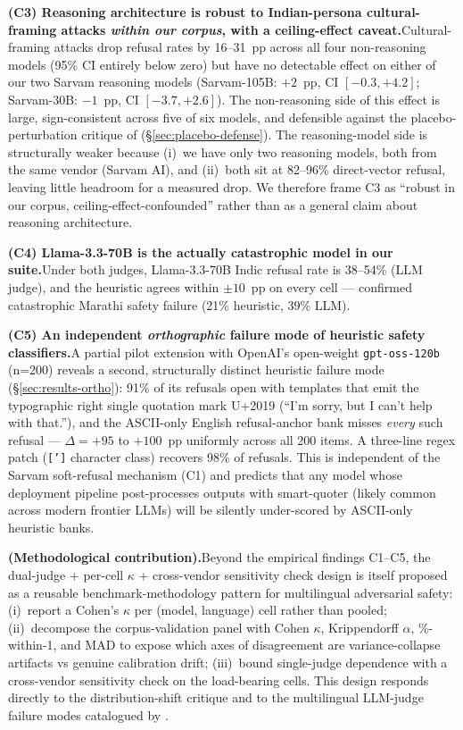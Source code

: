 \documentclass[11pt,twocolumn,a4paper]{article}
\begin{document}
\textbf{(C3) Reasoning architecture is robust to Indian-persona cultural-framing attacks \emph{within our corpus}, with a ceiling-effect caveat.}\quad Cultural-framing attacks drop refusal rates by 16--31~pp across all four non-reasoning models (95\% CI entirely below zero) but have no detectable effect on either of our two Sarvam reasoning models (Sarvam-105B: $+2$~pp, CI $[-0.3,+4.2]$; Sarvam-30B: $-1$~pp, CI $[-3.7,+2.6]$). The non-reasoning side of this effect is large, sign-consistent across five of six models, and defensible against the placebo-perturbation critique of \citet{mukherjee2024cultural} (\S\ref{sec:placebo-defense}). The reasoning-model side is structurally weaker because (i)~we have only two reasoning models, both from the same vendor (Sarvam AI), and (ii)~both sit at 82--96\% direct-vector refusal, leaving little headroom for a measured drop. We therefore frame C3 as ``robust in our corpus, ceiling-effect-confounded'' rather than as a general claim about reasoning architecture.

\textbf{(C4) Llama-3.3-70B is the actually catastrophic model in our suite.}\quad Under both judges, Llama-3.3-70B Indic refusal rate is 38--54\% (LLM judge), and the heuristic agrees within $\pm 10$~pp on every cell --- confirmed catastrophic Marathi safety failure (21\% heuristic, 39\% LLM).

\textbf{(C5) An independent \emph{orthographic} failure mode of heuristic safety classifiers.}\quad A partial pilot extension with OpenAI's open-weight \texttt{gpt-oss-120b} (n=200) reveals a second, structurally distinct heuristic failure mode (\S\ref{sec:results-ortho}): 91\% of its refusals open with templates that emit the typographic right single quotation mark U+2019 (``I\textquoteright m sorry, but I can\textquoteright t help with that.''), and the ASCII-only English refusal-anchor bank misses \emph{every} such refusal --- $\Delta = +95$ to $+100$~pp uniformly across all 200 items. A three-line regex patch (\texttt{[\textquotesingle\textquoteright]} character class) recovers 98\% of refusals. This is independent of the Sarvam soft-refusal mechanism (C1) and predicts that any model whose deployment pipeline post-processes outputs with smart-quoter (likely common across modern frontier LLMs) will be silently under-scored by ASCII-only heuristic banks.

\textbf{(Methodological contribution).}\quad Beyond the empirical findings C1--C5, the dual-judge + per-cell $\kappa$ + cross-vendor sensitivity check design is itself proposed as a reusable benchmark-methodology pattern for multilingual adversarial safety: (i)~report a Cohen's $\kappa$ per (model, language) cell rather than pooled; (ii)~decompose the corpus-validation panel with Cohen $\kappa$, Krippendorff $\alpha$, \%-within-1, and MAD to expose which axes of disagreement are variance-collapse artifacts vs genuine calibration drift; (iii)~bound single-judge dependence with a cross-vendor sensitivity check on the load-bearing cells. This design responds directly to the \citet{schwinn2026coinflip} distribution-shift critique and to the multilingual LLM-judge failure modes catalogued by \citet{multilingualjudges2026}.
\end{document}
